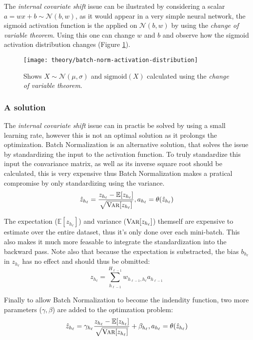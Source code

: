 The \textit{internal covariate shift} issue can be ilustrated by considering a scalar $a = w x + b \sim \mathcal{N}(b, w)$, as it would appear in a very simple neural network, the sigmoid activation function is the applied on $\mathcal{N}(b, w)$ by using the \textit{change of variable theorem}. Using this one can change $w$ and $b$ and observe how the sigmoid activation distribution changes (Figure \ref{fig:convergence:batch-norm:activation-distribution}).

\begin{figure}[h]
	\centering
	\texttt{[image: theory/batch-norm-activation-distribution]}
	\caption{Shows $X \sim \mathcal{N}(\mu, \sigma)$ and $\mathrm{sigmoid}(X)$ calculated using the \textit{change of variable theorem}.}
	\label{fig:convergence:batch-norm:activation-distribution}
\end{figure}

\subsubsection{A solution}
The \textit{internal covariate shift} issue can in practis be solved by using a small learning rate, however this is not an optimal solution as it prolongs the optimization. Batch Normalization is an alternative solution, that solves the issue by standardizing the input to the activation function. To truly standardize this input the convariance matrix, as well as its inverse square root should be calculated, this is very expensive thus Batch Normalization makes a pratical compromise by only standardizing using the variance.
\begin{equation}
\hat{z}_{h_\ell} = \frac{z_{h_\ell} - \mathbb{E}[z_{h_\ell}]}{\sqrt{\textsc{Var}[z_{h_\ell}]}}, a_{h_\ell} = \theta(\hat{z}_{h_\ell})
\end{equation}

The expectation ($\mathbb{E}[z_{h_\ell}]$) and variance ($\textsc{Var}[z_{h_\ell}]$) themself are expensive to estimate over the entire dataset, thus it's only done over each mini-batch. This also makes it much more feasable to integrate the standardization into the backward pass. Note also that because the expectation is substracted, the bias $b_{h_\ell}$ in $z_{h_\ell}$ has no effect and should thus be obmitted:
\begin{equation}
z_{h_\ell} = \sum_{h_{\ell-1}}^{H_{\ell-1}} w_{h_{\ell-1}, h_\ell} a_{h_{\ell-1}} 
\end{equation}


Finally to allow Batch Normalization to become the indendity function, two more parameters ($\gamma, \beta$) are added to the optimzation problem:
\begin{equation}
\hat{z}_{h_\ell} = \gamma_{h_\ell} \frac{z_{h_\ell} - \mathbb{E}[z_{h_\ell}]}{\sqrt{\textsc{Var}[z_{h_\ell}]}} + \beta_{h_\ell}, a_{h_\ell} = \theta(\hat{z}_{h_\ell})
\label{eq:theory:convergence:batch-norm}
\end{equation}


